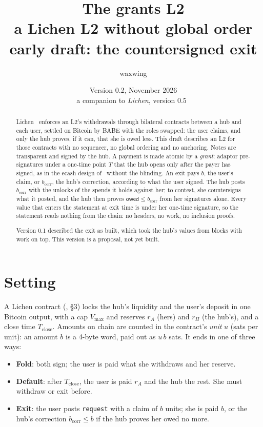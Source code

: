\documentclass[11pt]{article}
\title{\textbf{The grants L2}\\a Lichen L2 without global order\\[2pt]\large early draft: the countersigned exit}
\author{waxwing}
\date{Version 0.2, November 2026\\[2pt]\small a companion to \emph{Lichen}, version 0.5~\cite{lichen}}
\theoremstyle{plain}
\theoremstyle{definition}
\newcommand{\vmax}{V_{\max}}
\newcommand{\Tc}{T_{\mathrm{close}}}
\newcommand{\bcorr}{b_{\mathrm{corr}}}
\newcommand{\tx}[1]{\texttt{#1}}
\newcommand{\owed}{\mathsf{owed}}
\begin{document}
\maketitle

\begin{abstract}
Lichen~\cite{lichen} enforces an L2's withdrawals through bilateral
contracts between a hub and each user, settled on Bitcoin by BABE with
the roles swapped: the user claims, and only the hub proves, if it can,
that she is owed less. This draft describes an L2 for those contracts
with no sequencer, no global ordering and no anchoring. Notes are
transparent and signed by the hub. A payment is made atomic by a
\emph{grant}: adaptor pre-signatures under a one-time point $T$ that
the hub opens only after the payer has signed, as in the ecash design
of~\cite{ecash} without the blinding. An exit pays $b$, the user's
claim, or $\bcorr$, the hub's correction, according to what the user
signed. The hub posts $\bcorr$ with the unlocks of the spends it holds
against her; to contest, she countersigns what it posted, and the hub
then proves $\owed \le \bcorr$ from her signatures alone. Every value
that enters the statement at exit time is under her one-time
signature, so the statement reads nothing from the chain: no headers,
no work, no inclusion proofs.

Version 0.1 described the exit as built, which took the hub's values
from blocks with work on top. This version is a proposal, not yet
built.
\end{abstract}

\tableofcontents

\section{Setting}

A Lichen contract (\cite{lichen}, \S3) locks the hub's liquidity and the
user's deposit in one Bitcoin output, with a cap $\vmax$ and reserves
$r_A$ (hers) and $r_H$ (the hub's), and a close time $\Tc$. Amounts on
chain are counted in the contract's \emph{unit} $u$ (sats per unit): an
amount $b$ is a 4-byte word, paid out as $u\,b$ sats. It ends in one of
three ways:
\begin{itemize}[nosep]
\item \textbf{Fold}: both sign; the user is paid what she withdraws and
  her reserve.
\item \textbf{Default}: after $\Tc$, the user is paid $r_A$ and the hub
  the rest. She must withdraw or exit before.
\item \textbf{Exit}: the user posts \tx{request} with a claim of $b$
  units; she is paid $b$, or the hub's correction $\bcorr \le b$ if the
  hub proves her owed no more.
\end{itemize}
\end{document}
